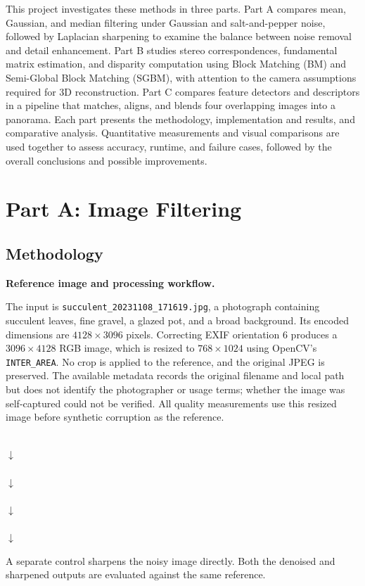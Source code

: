 \documentclass[a4paper,12pt]{article}
\begin{document}
This project investigates these methods in three parts. Part A compares mean, Gaussian, and median filtering under Gaussian and salt-and-pepper noise, followed by Laplacian sharpening to examine the balance between noise removal and detail enhancement. Part B studies stereo correspondences, fundamental matrix estimation, and disparity computation using Block Matching (BM) and Semi-Global Block Matching (SGBM), with attention to the camera assumptions required for 3D reconstruction. Part C compares feature detectors and descriptors in a pipeline that matches, aligns, and blends four overlapping images into a panorama. Each part presents the methodology, implementation and results, and comparative analysis. Quantitative measurements and visual comparisons are used together to assess accuracy, runtime, and failure cases, followed by the overall conclusions and possible improvements.

\section{Part A: Image Filtering}
\label{sec:part-a}
\subsection{Methodology}

\textbf{Reference image and processing workflow.}\par
The input is \texttt{succulent\_20231108\_171619.jpg}, a photograph containing succulent leaves, fine gravel, a glazed pot, and a broad background. Its encoded dimensions are $4128\times3096$ pixels. Correcting EXIF orientation 6 produces a $3096\times4128$ RGB image, which is resized to $768\times1024$ using OpenCV's \texttt{INTER\_AREA}. No crop is applied to the reference, and the original JPEG is preserved. The available metadata records the original filename and local path but does not identify the photographer or usage terms; whether the image was self-captured could not be verified. All quality measurements use this resized image before synthetic corruption as the reference.

\begin{center}
\small
{}\\[5pt]
$\downarrow$\\[5pt]
\\[5pt]
$\downarrow$\\[5pt]
\\[5pt]
$\downarrow$\\[5pt]
\\[5pt]
$\downarrow$\\[5pt]
\end{center}
A separate control sharpens the noisy image directly. Both the denoised and sharpened outputs are evaluated against the same reference.
\end{document}
